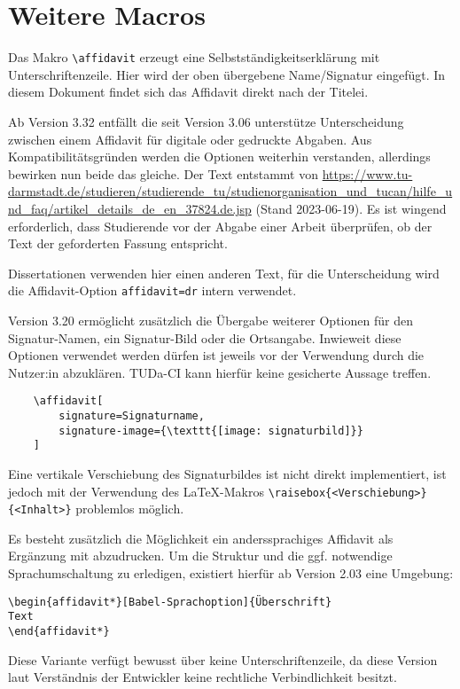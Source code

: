\documentclass[
	german,%
	ruledheaders=section,%
	class=report,%
	thesis={type=bachelor},%
	accentcolor=9c,%
	custommargins=true,%
	marginpar=false,%
	parskip=half-,%
	fontsize=11pt,%
]{tudapub}
\begin{document}
\section{Weitere Macros}
Das Makro \verb+\affidavit+ erzeugt eine Selbstständigkeitserklärung mit Unterschriftenzeile. Hier wird der oben übergebene Name/Signatur eingefügt.
In diesem Dokument findet sich das Affidavit direkt nach der Titelei.

Ab Version 3.32 entfällt die seit Version 3.06 unterstütze Unterscheidung zwischen einem Affidavit für digitale oder gedruckte Abgaben. Aus Kompatibilitätsgründen werden die Optionen weiterhin verstanden, allerdings bewirken nun beide das gleiche. Der Text entstammt von  \url{https://www.tu-darmstadt.de/studieren/studierende_tu/studienorganisation_und_tucan/hilfe_und_faq/artikel_details_de_en_37824.de.jsp} (Stand 2023-06-19). Es ist wingend erforderlich, dass Studierende vor der Abgabe einer Arbeit überprüfen, ob der Text der geforderten Fassung entspricht.

Dissertationen verwenden hier einen anderen Text, für die Unterscheidung wird die Affidavit-Option \verb+affidavit=dr+ intern verwendet.

Version 3.20 ermöglicht zusätzlich die Übergabe weiterer Optionen für den Signatur-Namen, ein Signatur-Bild oder die Ortsangabe.
Inwieweit diese Optionen verwendet werden dürfen ist jeweils vor der Verwendung durch die Nutzer:in abzuklären.
TUDa-CI kann hierfür keine gesicherte Aussage treffen.
\begin{verbatim}
    \affidavit[
        signature=Signaturname,
        signature-image={\texttt{[image: signaturbild]}}
    ]
\end{verbatim}
Eine vertikale Verschiebung des Signaturbildes ist nicht direkt implementiert, ist jedoch mit der Verwendung des \LaTeX-Makros \verb+\raisebox{<Verschiebung>}{<Inhalt>}+ problemlos möglich.

Es besteht zusätzlich die Möglichkeit ein anderssprachiges Affidavit als Ergänzung mit abzudrucken. Um die Struktur und die ggf. notwendige Sprachumschaltung zu erledigen, existiert hierfür ab Version 2.03 eine Umgebung:

\begin{verbatim}
\begin{affidavit*}[Babel-Sprachoption]{Überschrift}
Text
\end{affidavit*}
\end{verbatim}

Diese Variante verfügt bewusst über keine Unterschriftenzeile, da diese Version laut Verständnis der Entwickler keine rechtliche Verbindlichkeit besitzt.
\end{document}

